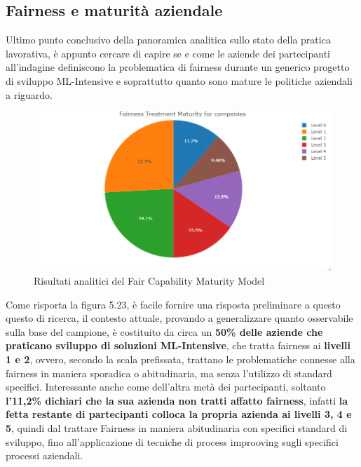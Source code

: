     \subsection{Fairness e maturità aziendale}
    
    \begin{center}
    	\hspace*{-5mm}%
    \end{center}
    
    Ultimo punto conclusivo della panoramica analitica sullo stato della pratica lavorativa, è appunto cercare di capire se e come le aziende dei partecipanti all'indagine definiscono la problematica di fairness durante un generico progetto di sviluppo ML-Intensive e soprattutto quanto sono mature le politiche aziendali a riguardo. 
    
    \begin{figure}[h!]
        \centering
        \includegraphics[width=1\textwidth]{figure/Analisi/RQ5/Fairness Treatment Maturity for companies.png}
        \caption{Risultati analitici del Fair Capability Maturity Model}
    \end{figure}
    
    Come risporta la figura 5.23, è facile fornire una risposta preliminare a questo questo di ricerca, il contesto attuale, provando a generalizzare quanto osservabile sulla base del campione, è costituito da circa un \textbf{50\% delle aziende che praticano sviluppo di soluzioni ML-Intensive}, che tratta fairness ai \textbf{livelli 1 e 2}, ovvero, secondo la scala prefissata, trattano le problematiche connesse alla fairness in maniera sporadica o abitudinaria, ma senza l'utilizzo di standard specifici. Interessante anche come dell'altra metà dei partecipanti, soltanto \textbf{l'11,2\% dichiari che la sua azienda non tratti affatto fairness}, infatti \textbf{la fetta restante di partecipanti colloca la propria azienda ai livelli 3, 4 e 5}, quindi dal trattare Fairness in maniera abitudinaria con specifici standard di sviluppo, fino all'applicazione di tecniche di process improoving sugli specifici processi aziendali. 
    
